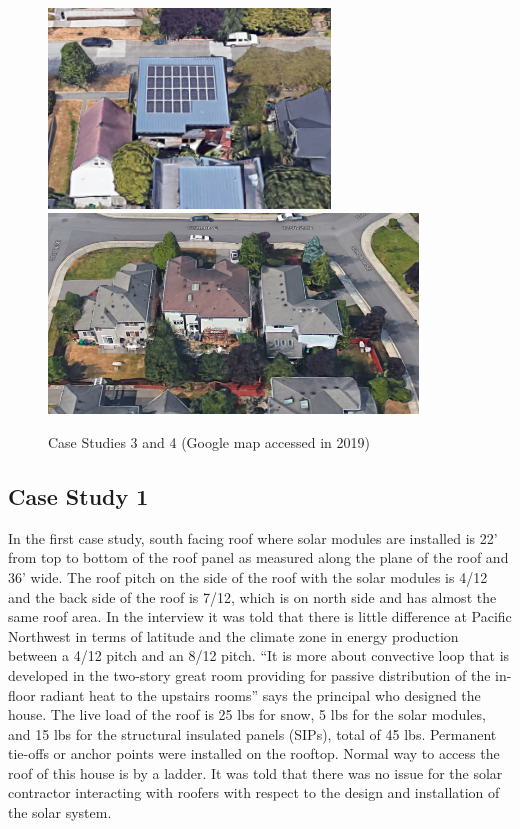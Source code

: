 \documentclass[]{article}
\begin{document}
\begin{figure}
\includegraphics[width=2.95in]{../case/case3/google} \includegraphics[width=3.86in]{../case/case4/google} \caption{Case Studies 3 and 4 (Google map accessed in 2019)}\label{fig:unnamed-chunk-4}
\end{figure}

\hypertarget{case-study-1}{%
\subsection{Case Study 1}\label{case-study-1}}

In the first case study, south facing roof where solar modules are
installed is 22' from top to bottom of the roof panel as measured along
the plane of the roof and 36' wide. The roof pitch on the side of the
roof with the solar modules is 4/12 and the back side of the roof is
7/12, which is on north side and has almost the same roof area. In the
interview it was told that there is little difference at Pacific
Northwest in terms of latitude and the climate zone in energy production
between a 4/12 pitch and an 8/12 pitch. ``It is more about convective
loop that is developed in the two-story great room providing for passive
distribution of the in-floor radiant heat to the upstairs rooms'' says
the principal who designed the house. The live load of the roof is 25
lbs for snow, 5 lbs for the solar modules, and 15 lbs for the structural
insulated panels (SIPs), total of 45 lbs. Permanent tie-offs or anchor
points were installed on the rooftop. Normal way to access the roof of
this house is by a ladder. It was told that there was no issue for the
solar contractor interacting with roofers with respect to the design and
installation of the solar system.
\end{document}
